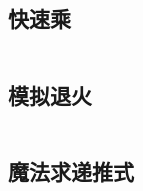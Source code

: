 \documentclass[UTF8]{ctexart}
\begin{document}
\subsection{快速乘}
\inputminted{cpp}{others/快速乘.cpp}

\subsection{模拟退火}
\inputminted{cpp}{others/模拟退火.cpp}

\subsection{魔法求递推式}
\inputminted{cpp}{others/魔法求递推式.cpp}



\end{document}
